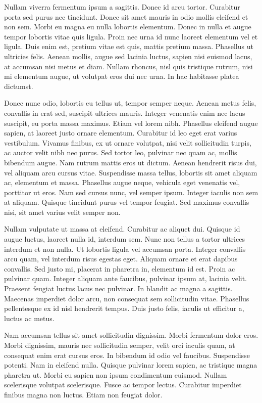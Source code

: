 Nullam viverra fermentum ipsum a sagittis. Donec id arcu tortor. Curabitur porta sed purus nec tincidunt. Donec sit amet mauris in odio mollis eleifend et non sem. Morbi eu magna eu nulla lobortis elementum. Donec in nulla et augue tempor lobortis vitae quis ligula. Proin nec urna id nunc laoreet elementum vel et ligula. Duis enim est, pretium vitae est quis, mattis pretium massa. Phasellus ut ultricies felis. Aenean mollis, augue sed lacinia luctus, sapien nisi euismod lacus, at accumsan nisi metus et diam. Nullam rhoncus, nisl quis tristique rutrum, nisi mi elementum augue, ut volutpat eros dui nec urna. In hac habitasse platea dictumst.

Donec nunc odio, lobortis eu tellus ut, tempor semper neque. Aenean metus felis, convallis in erat sed, suscipit ultrices mauris. Integer venenatis enim nec lacus suscipit, eu porta massa maximus. Etiam vel lorem nibh. Phasellus eleifend augue sapien, at laoreet justo ornare elementum. Curabitur id leo eget erat varius vestibulum. Vivamus finibus, ex ut ornare volutpat, nisi velit sollicitudin turpis, ac auctor velit nibh nec purus. Sed tortor leo, pulvinar nec quam ac, mollis bibendum augue. Nam rutrum mattis eros ut dictum. Aenean hendrerit risus dui, vel aliquam arcu cursus vitae. Suspendisse massa tellus, lobortis sit amet aliquam ac, elementum et massa. Phasellus augue neque, vehicula eget venenatis vel, porttitor ut eros. Nam sed cursus nunc, vel semper ipsum. Integer iaculis non sem at aliquam. Quisque tincidunt purus vel tempor feugiat. Sed maximus convallis nisi, sit amet varius velit semper non.

Nullam vulputate ut massa at eleifend. Curabitur ac aliquet dui. Quisque id augue luctus, laoreet nulla id, interdum sem. Nunc non tellus a tortor ultrices interdum et non nulla. Ut lobortis ligula vel accumsan porta. Integer convallis arcu quam, vel interdum risus egestas eget. Aliquam ornare et erat dapibus convallis. Sed justo mi, placerat in pharetra in, elementum id est. Proin ac pulvinar quam. Integer aliquam ante faucibus, pulvinar ipsum at, lacinia velit. Praesent feugiat luctus lacus nec pulvinar. In blandit ac magna a sagittis. Maecenas imperdiet dolor arcu, non consequat sem sollicitudin vitae. Phasellus pellentesque ex id nisl hendrerit tempus. Duis justo felis, iaculis ut efficitur a, luctus ac metus.

Nam accumsan tellus sit amet sollicitudin dignissim. Morbi fermentum dolor eros. Morbi dignissim, mauris nec sollicitudin semper, velit orci iaculis quam, at consequat enim erat cursus eros. In bibendum id odio vel faucibus. Suspendisse potenti. Nam in eleifend nulla. Quisque pulvinar lorem sapien, ac tristique magna pharetra ut. Morbi eu sapien non ipsum condimentum euismod. Nullam scelerisque volutpat scelerisque. Fusce ac tempor lectus. Curabitur imperdiet finibus magna non luctus. Etiam non feugiat dolor.

